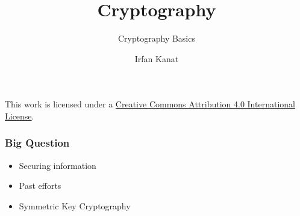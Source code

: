 \documentclass[aspectratio=169]{beamer}              %
\title{Cryptography}
\subtitle{Cryptography Basics}
\author{Irfan Kanat}
\institute[CBS]{{Department of Digitization}\\ Copenhagen Business School}
\begin{document}
\begin{frame}

	\titlepage


	\vfill
	{\tiny \centering This work is licensed under a \href{http://creativecommons.org/licenses/by/4.0/}{Creative Commons Attribution 4.0 International License}.}

\end{frame}



\begin{frame}
	\frametitle{Big Question}
    
    \begin{itemize}
    	\item Securing information
    	\item Past efforts
    	\item Symmetric Key Cryptography
    \end{itemize}

\end{frame}

\end{document}
